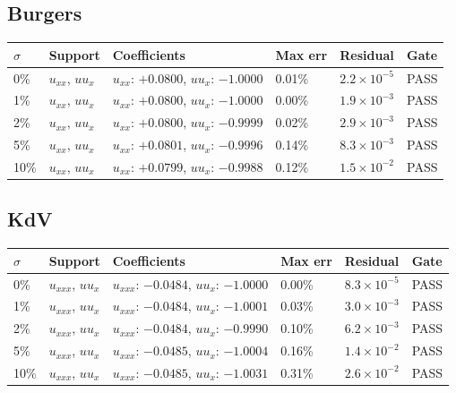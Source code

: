 \documentclass[11pt]{article}
\begin{document}
\subsection*{Burgers}
\begin{center}\small\begin{tabular}{llp{5.2cm}lll}
\toprule
$\sigma$ & Support & Coefficients & Max err & Residual & Gate \\
\midrule
0\% & $u_{xx}$, $u u_x$ & $u_{xx}$: $+0.0800$, $u u_x$: $-1.0000$ & 0.01\% & $2.2 \times 10^{-5}$ & PASS \\
1\% & $u_{xx}$, $u u_x$ & $u_{xx}$: $+0.0800$, $u u_x$: $-1.0000$ & 0.00\% & $1.9 \times 10^{-3}$ & PASS \\
2\% & $u_{xx}$, $u u_x$ & $u_{xx}$: $+0.0800$, $u u_x$: $-0.9999$ & 0.02\% & $2.9 \times 10^{-3}$ & PASS \\
5\% & $u_{xx}$, $u u_x$ & $u_{xx}$: $+0.0801$, $u u_x$: $-0.9996$ & 0.14\% & $8.3 \times 10^{-3}$ & PASS \\
10\% & $u_{xx}$, $u u_x$ & $u_{xx}$: $+0.0799$, $u u_x$: $-0.9988$ & 0.12\% & $1.5 \times 10^{-2}$ & PASS \\
\bottomrule
\end{tabular}\end{center}

\subsection*{KdV}
\begin{center}\small\begin{tabular}{llp{5.2cm}lll}
\toprule
$\sigma$ & Support & Coefficients & Max err & Residual & Gate \\
\midrule
0\% & $u_{xxx}$, $u u_x$ & $u_{xxx}$: $-0.0484$, $u u_x$: $-1.0000$ & 0.00\% & $8.3 \times 10^{-5}$ & PASS \\
1\% & $u_{xxx}$, $u u_x$ & $u_{xxx}$: $-0.0484$, $u u_x$: $-1.0001$ & 0.03\% & $3.0 \times 10^{-3}$ & PASS \\
2\% & $u_{xxx}$, $u u_x$ & $u_{xxx}$: $-0.0484$, $u u_x$: $-0.9990$ & 0.10\% & $6.2 \times 10^{-3}$ & PASS \\
5\% & $u_{xxx}$, $u u_x$ & $u_{xxx}$: $-0.0485$, $u u_x$: $-1.0004$ & 0.16\% & $1.4 \times 10^{-2}$ & PASS \\
10\% & $u_{xxx}$, $u u_x$ & $u_{xxx}$: $-0.0485$, $u u_x$: $-1.0031$ & 0.31\% & $2.6 \times 10^{-2}$ & PASS \\
\bottomrule
\end{tabular}\end{center}
\end{document}
